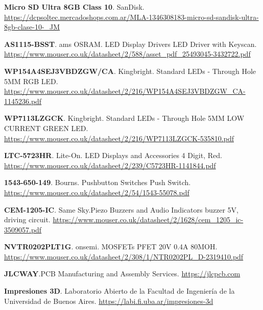\begin{thebibliography}{30}
\textbf{Micro SD Ultra 8GB Class 10}. SanDisk.
\href{https://dcpsoltec.mercadoshops.com.ar/MLA-1346308183-micro-sd-sandisk-ultra-8gb-clase-10-_JM}{https://dcpsoltec.mercadoshops.com.ar/MLA-1346308183-micro-sd-sandisk-ultra-8gb-clase-10-\_JM}

\textbf{AS1115-BSST}. ams OSRAM. LED Display Drivers LED Driver with Keyscan.
\href{https://www.mouser.co.uk/datasheet/2/588/asset_pdf_25493045-3432722.pdf}{https://www.mouser.co.uk/datasheet/2/588/asset\_pdf\_25493045-3432722.pdf}

\textbf{WP154A4SEJ3VBDZGW/CA}. Kingbright. Standard LEDs - Through Hole 5MM RGB LED.
\href{https://www.mouser.co.uk/datasheet/2/216/WP154A4SEJ3VBDZGW_CA-1145236.pdf}{https://www.mouser.co.uk/datasheet/2/216/WP154A4SEJ3VBDZGW\_CA-1145236.pdf}


\textbf{WP7113LZGCK}. Kingbright. Standard LEDs - Through Hole 5MM LOW CURRENT GREEN LED.
\href{https://www.mouser.co.uk/datasheet/2/216/WP7113LZGCK-535810.pdf}{https://www.mouser.co.uk/datasheet/2/216/WP7113LZGCK-535810.pdf}

\textbf{LTC-5723HR}. Lite-On. LED Displays and Accessories 4 Digit, Red. 
\href{https://www.mouser.co.uk/datasheet/2/239/C5723HR-1141844.pdf}{https://www.mouser.co.uk/datasheet/2/239/C5723HR-1141844.pdf}

\textbf{1543-650-149}. Bourns. Pushbutton Switches Push Switch.
\href{https://www.mouser.co.uk/datasheet/2/54/1543-55078.pdf}{https://www.mouser.co.uk/datasheet/2/54/1543-55078.pdf}

\textbf{CEM-1205-IC}. Same Sky.Piezo Buzzers and Audio Indicators buzzer 5V, driving circuit.
\href{https://www.mouser.co.uk/datasheet/2/1628/cem_1205_ic-3509057.pdf}{https://www.mouser.co.uk/datasheet/2/1628/cem\_1205\_ic-3509057.pdf}


\textbf{NVTR0202PLT1G}. onsemi. MOSFETs PFET 20V 0.4A 80MOH.
\href{https://www.mouser.co.uk/datasheet/2/308/1/NTR0202PL_D-2319410.pdf}{https://www.mouser.co.uk/datasheet/2/308/1/NTR0202PL\_D-2319410.pdf}


\textbf{JLCWAY}.PCB Manufacturing and Assembly Services.
\href{https://jlcpcb.com}{https://jlcpcb.com}

\textbf{Impresiones 3D}. Laboratorio Abierto de la Facultad de Ingeniería de la Universidad de Buenos Aires.
\href{https://labi.fi.uba.ar/impresiones-3d}{https://labi.fi.uba.ar/impresiones-3d}


\end{thebibliography}
